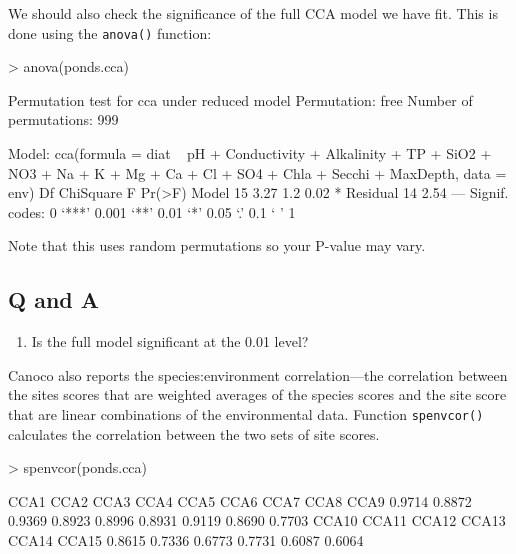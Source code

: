 \documentclass[a4paper,10pt]{article}
\begin{document}
We should also check the significance of the full CCA model we have fit. This is done using the \texttt{anova()} function:
\begin{Schunk}
\begin{Sinput}
> anova(ponds.cca)
\end{Sinput}
\end{Schunk}

\begin{Schunk}
\begin{Soutput}
Permutation test for cca under reduced model
Permutation: free
Number of permutations: 999

Model: cca(formula = diat ~ pH + Conductivity + Alkalinity + TP + SiO2 + NO3 + Na + K + Mg + Ca + Cl + SO4 + Chla + Secchi + MaxDepth, data = env)
         Df ChiSquare   F Pr(>F)  
Model    15      3.27 1.2   0.02 *
Residual 14      2.54             
---
Signif. codes:  0 ‘***’ 0.001 ‘**’ 0.01 ‘*’ 0.05 ‘.’ 0.1 ‘ ’ 1
\end{Soutput}
\end{Schunk}

Note that this uses random permutations so your P-value may vary.

\subsection*{Q and A}
\begin{enumerate}
\item Is the full model significant at the 0.01 level?
\end{enumerate}

Canoco also reports the species:environment correlation---the correlation between the sites scores that are weighted averages of the species scores and the site score that are linear combinations of the environmental data. Function \texttt{spenvcor()} calculates the correlation between the two sets of site scores.

\begin{Schunk}
\begin{Sinput}
> spenvcor(ponds.cca)
\end{Sinput}
\begin{Soutput}
  CCA1   CCA2   CCA3   CCA4   CCA5   CCA6   CCA7   CCA8   CCA9 
0.9714 0.8872 0.9369 0.8923 0.8996 0.8931 0.9119 0.8690 0.7703 
 CCA10  CCA11  CCA12  CCA13  CCA14  CCA15 
0.8615 0.7336 0.6773 0.7731 0.6087 0.6064 
\end{Soutput}
\end{Schunk}
\end{document}
